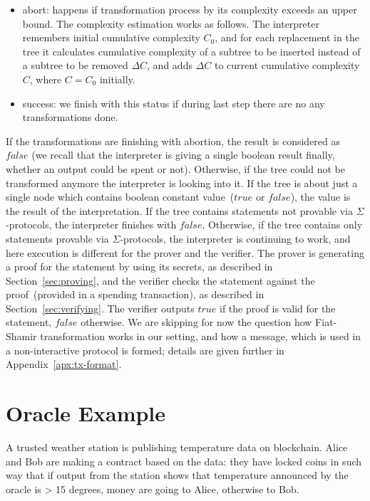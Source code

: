 \documentclass[11pt]{article}
\newcommand{\authnote}[2]{\marginpar{\parbox{\marginparwidth}{\tiny %
  \textsf{#1 {\textcolor{blue}{notes: #2}}}}}%
  \textcolor{blue}{\textbf{\dag}}}
\newcommand{\authnote}[2]{
  \textsf{#1 \textcolor{blue}{: #2}}}
\newcommand{\authnote}[2]{}
\newcommand{\knote}[1]{{\authnote{\textcolor{green}{kushti notes}}{#1}}}
\begin{document}
{\begin{itemize}
    \item{abort: } happens if transformation process by its complexity exceeds an upper bound. The complexity estimation works as follows. The interpreter remembers initial cumulative complexity $C_0$, and for each replacement in the tree it calculates cumulative complexity of a subtree to be inserted instead of a subtree to be removed $\Delta C$, and adds $\Delta C$ to current cumulative complexity $C$, where $C = C_0$ initially.  
    \item{success: } we finish with this status if during last step there are no any transformations done.  
\end{itemize} 

If the transformations are finishing with abortion, the result is considered as $false$ (we recall that the interpreter is giving a single boolean result finally, whether an output could be spent or not). Otherwise, if the tree could not be transformed anymore the interpreter is looking into it. If the tree is about just a single node which contains boolean constant value~($true$ or $false$), the value is the result of the interpretation. If the tree contains statements not provable via $\Sigma$-protocols, the interpreter finishes with $false$. Otherwise, if the tree contains only statements provable via $\Sigma$-protocols, the interpreter is continuing to work, and here execution is different for the prover and the verifier. The prover is generating a proof for the statement by using its secrets, as described in Section~\ref{sec:proving}, and the verifier checks the statement against the proof~(provided in a spending transaction), as described in Section~\ref{sec:verifying}. The verifier outputs $true$ if the proof is valid for the statement, $false$ otherwise. We are skipping for now the question how Fiat-Shamir transformation works in our setting, and how a message, which is used in a non-interactive protocol is formed; details are given further in Appendix~\ref{apx:tx-format}. 



\section{Oracle Example}

\knote{Text below is just copied from code comments, polish it}

A trusted weather station is publishing temperature data on blockchain. Alice and Bob are making a contract based on the data:
they have locked coins in such way that if output from the station shows that temperature announced by the oracle is > 15 degrees, money are going to Alice, otherwise to Bob.
    
}
\end{document}
